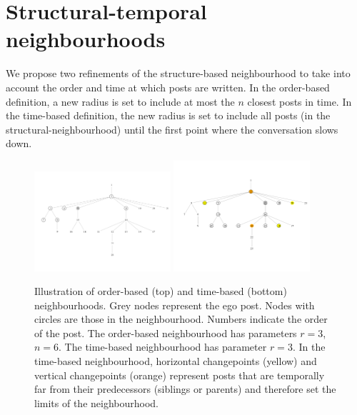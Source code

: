 \documentclass[conference]{IEEEtran}
\begin{document}
\section{Structural-temporal neighbourhoods}\label{sec:temporal}
We propose two refinements of the structure-based neighbourhood to take into account the order and time at which posts are written. In the order-based definition, a new radius is set to include at most the $n$ closest posts in time.  In the time-based definition, the new radius is set to include all posts (in the structural-neighbourhood) until the first point where the conversation slows down. 


\begin{figure}
\centering
\includegraphics[width=0.45\textwidth]{order_neighbourhood}
\includegraphics[width=0.45\textwidth]{breakpoints}
\caption{Illustration of order-based (top) and time-based (bottom) neighbourhoods. Grey nodes represent the ego post. Nodes with circles are those in the neighbourhood. Numbers indicate the order of the post. The order-based neighbourhood has parameters $r=3$, $n=6$. The time-based neighbourhood has parameter $r=3$. In the time-based neighbourhood, horizontal changepoints (yellow) and vertical changepoints (orange) represent posts that are temporally far from their predecessors (siblings or parents) and therefore set the limits of the neighbourhood.}
\label{fig:cutpoints}
\end{figure}
\end{document}
